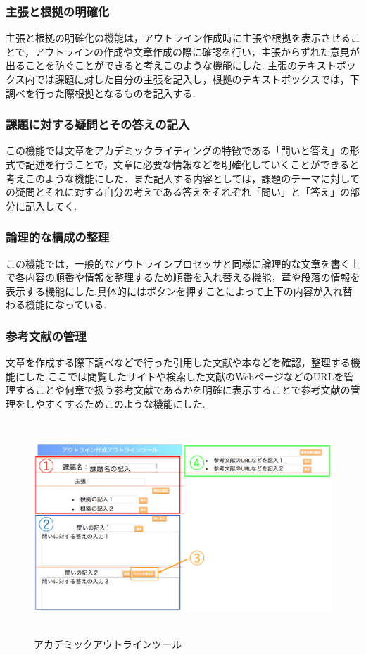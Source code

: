 \documentclass[a4j,12pt]{jarticle}
\begin{document}
\subsubsection{主張と根拠の明確化}
主張と根拠の明確化の機能は，アウトライン作成時に主張や根拠を表示させることで，アウトラインの作成や文章作成の際に確認を行い，主張からずれた意見が出ることを防ぐことができると考えこのような機能にした.
主張のテキストボックス内では課題に対した自分の主張を記入し，根拠のテキストボックスでは，下調べを行った際根拠となるものを記入する.

\subsubsection{課題に対する疑問とその答えの記入}
この機能では文章をアカデミックライティングの特徴である「問いと答え」の形式で記述を行うことで，文章に必要な情報などを明確化していくことができると考えこのような機能にした．また記入する内容としては，課題のテーマに対しての疑問とそれに対する自分の考えである答えをそれぞれ「問い」と「答え」の部分に記入してく.

\subsubsection{論理的な構成の整理}
この機能では，一般的なアウトラインプロセッサと同様に論理的な文章を書く上で各内容の順番や情報を整理するため順番を入れ替える機能，章や段落の情報を表示する機能にした.具体的にはボタンを押すことによって上下の内容が入れ替わる機能になっている.

\subsubsection{参考文献の管理}
文章を作成する際下調べなどで行った引用した文献や本などを確認，整理する機能にした.ここでは閲覧したサイトや検索した文献のWebページなどのURLを管理することや何章で扱う参考文献であるかを明確に表示することで参考文献の管理をしやすくするためこのような機能にした.
\newpage
\begin{figure}[h]
\begin{center}
 \includegraphics[clip,width=130mm,height=80mm]{figure/pp01.pdf}
\end{center}
 \caption{アカデミックアウトラインツール}
 \label{fig:g}
\end{figure}
\newpage
\end{document}
